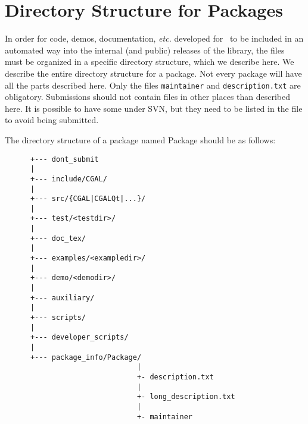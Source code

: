 
\chapter{Directory Structure for Packages\label{chap:directory_structure}}

In order for code, demos, documentation, {\em etc.} developed for \cgal\ to 
be included in an automated way into the internal (and public) releases of the 
library, the files must be organized in a specific directory structure, which 
we describe here.  We describe the entire directory structure for a package. 
Not every package will have all the parts described here. Only the files
{\tt maintainer} and {\tt description.txt} 
are obligatory.
Submissions should not contain files in other places than described here.
It is possible to have some under SVN, but they need to be listed in the
 file to avoid being submitted.


The directory structure of a package named Package should be as follows: 

\begin{verbatim}
      +--- dont_submit
      |
      +--- include/CGAL/
      |
      +--- src/{CGAL|CGALQt|...}/
      |
      +--- test/<testdir>/
      |
      +--- doc_tex/
      |
      +--- examples/<exampledir>/
      |
      +--- demo/<demodir>/
      |
      +--- auxiliary/
      |
      +--- scripts/
      |
      +--- developer_scripts/
      |
      +--- package_info/Package/
                               |
                               +- description.txt
                               |
                               +- long_description.txt
                               |
                               +- maintainer
\end{verbatim}


